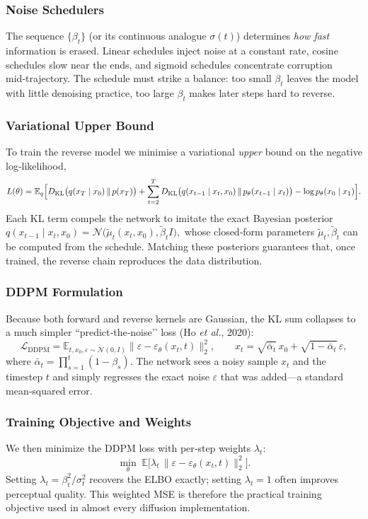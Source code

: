 \documentclass{article}
\begin{document}
\subsubsection*{Noise Schedulers}
The sequence \(\{\beta_t\}\) (or its continuous analogue \(\sigma(t)\)) determines \emph{how fast} information is erased.  Linear schedules inject noise at a constant rate, cosine schedules slow near the ends, and sigmoid schedules concentrate corruption mid‑trajectory.  The schedule must strike a balance: too small \(\beta_t\) leaves the model with little denoising practice, too large \(\beta_t\) makes later steps hard to reverse.

\subsubsection*{Variational Upper Bound}
To train the reverse model we minimise a variational \emph{upper} bound on the negative log‑likelihood,
\[
  L(\theta)
  = \mathbb{E}_{q}\Bigl[
      D_{\mathrm{KL}}\bigl(q(x_T\mid x_0)\,\|\,p(x_T)\bigr)
      + \sum_{t=2}^T
        D_{\mathrm{KL}}\bigl(q(x_{t-1}\mid x_t,x_0)\,\|\,
                             p_\theta(x_{t-1}\mid x_t)\bigr)
      - \log p_\theta(x_0\mid x_1)
    \Bigr].
\]
Each KL term compels the network to imitate the exact Bayesian posterior  
\(
  q(x_{t-1}\mid x_t,x_0)
  = \mathcal{N}\bigl(\tilde\mu_t(x_t,x_0),\tilde\beta_t I\bigr),
\)
whose closed‑form parameters
\(
  \tilde\mu_t,\tilde\beta_t
\)
can be computed from the schedule.  Matching these posteriors guarantees that, once trained, the reverse chain reproduces the data distribution.

\subsubsection*{DDPM Formulation}
Because both forward and reverse kernels are Gaussian, the KL sum collapses to a much simpler “predict‑the‑noise’’ loss (Ho \textit{et al.}, 2020):
\[
  \mathcal{L}_{\mathrm{DDPM}}
  = \mathbb{E}_{t,x_0,\varepsilon\sim\mathcal N(0,I)}
    \bigl\|\varepsilon - \varepsilon_\theta(x_t,t)\bigr\|_2^{2},
  \qquad
  x_t=\sqrt{\bar\alpha_t}\,x_0+\sqrt{1-\bar\alpha_t}\,\varepsilon,
\]
where \(\bar\alpha_t=\prod_{s=1}^t(1-\beta_s)\).  The network sees a noisy sample \(x_t\) and the timestep \(t\) and simply regresses the exact noise \(\varepsilon\) that was added—a standard mean‑squared error.

\subsubsection*{Training Objective and Weights}
We then minimize the DDPM loss with per‑step weights \(\lambda_t\):
\[
  \min_\theta
  \; \mathbb{E}\bigl[\lambda_t\,
    \|\varepsilon-\varepsilon_\theta(x_t,t)\|_2^2\bigr].
\]
Setting \(\lambda_t=\beta_t^2/\sigma_t^2\) recovers the ELBO exactly; setting \(\lambda_t=1\) often improves perceptual quality.  This weighted MSE is therefore the practical training objective used in almost every diffusion implementation.
\end{document}
